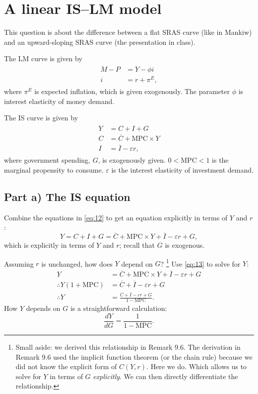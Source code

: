 \documentclass[12pt]{pracjourn_rwr}
\theoremstyle{definition}
\theoremstyle{remark}
\begin{document}
\section{A linear IS--LM model}

This question is about the difference between a flat SRAS curve (like in Mankiw) and
an upward-sloping SRAS curve (the presentation in class).

The LM curve is given by
\begin{align}
\begin{split}
\label{eq:11}
M - P &= Y - \phi i \\
i &= r + \pi^{E},
\end{split}
\end{align}
where $\pi^{E}$ is expected inflation, which is given exogenously.
The parameter $\phi$ is interest elasticity of money demand.

The IS curve is given by
\begin{align}
\begin{split}
\label{eq:12}
Y &= C + I + G \\
C &= \overline{C} + \text{MPC} \times Y \\
I &= \overline{I} - \varepsilon r,
\end{split}
\end{align}
where government spending, $G$, is exogenously given.
$0 < \text{MPC} < 1$ is the marginal propensity to consume.
$\varepsilon$ is the interest elasticity of investment demand.

\subsection{Part a) The IS equation}

Combine the equations in \eqref{eq:12} to get an equation explicitly in terms of $Y$ and $r$:
\begin{equation}
\label{eq:13}
Y = C + I + G = \overline{C} + \text{MPC} \times Y + \overline{I} - \varepsilon r + G,
\end{equation}
which is explicitly in terms of $Y$ and $r$; recall that $G$ is exogenous.

Assuming $r$ is unchanged, how does $Y$ depend on $G$?
\footnote{Small aside: we derived this relationship in Remark 9.6.
  The derivation in Remark 9.6 used the implicit function theorem (or the chain rule) because we did not know the explicit form of $C(Y,r)$.
  Here we do.
  Which allows us to solve for $Y$ in terms of $G$ \textit{explicitly}.
  We can then directly differentiate the relationship.}
Use \eqref{eq:13} to solve for $Y$:
\begin{align*}
Y &= \overline{C} + \text{MPC} \times Y + \overline{I} - \varepsilon r + G \\
\therefore Y \left( 1+ \text{MPC} \right) &= \overline{C} + \overline{I} - \varepsilon r + G \\
\therefore Y &= \frac{\overline{C} + \overline{I} - \varepsilon r + G}{1-\text{MPC}}.
\end{align*}
How $Y$ depends on $G$ is a straightforward calculation:
\begin{equation}
\label{eq:14}
\frac{d Y}{d G} = \frac{1}{1-\text{MPC}}.
\end{equation}
\end{document}
